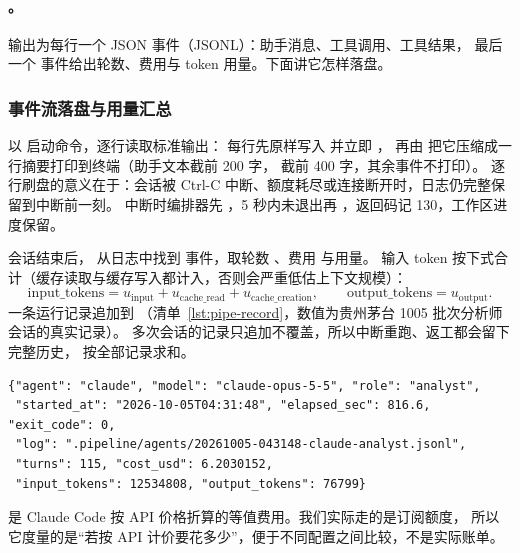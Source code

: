 \paragraph{。}输出为每行一个 JSON 事件（JSONL）：助手消息、工具调用、工具结果，
最后一个  事件给出轮数、费用与 token 用量。下面讲它怎样落盘。

\subsubsection{事件流落盘与用量汇总}

 以  启动命令，逐行读取标准输出：
每行先原样写入  并立即 ，
再由  把它压缩成一行摘要打印到终端（助手文本截前 200 字， 截前 400 字，其余事件不打印）。
逐行刷盘的意义在于：会话被 Ctrl-C 中断、额度耗尽或连接断开时，日志仍完整保留到中断前一刻。
中断时编排器先 ，5 秒内未退出再 ，返回码记 130，工作区进度保留。

会话结束后， 从日志中找到  事件，取轮数 、费用  与用量。
输入 token 按下式合计（缓存读取与缓存写入都计入，否则会严重低估上下文规模）：
\begin{equation}
  \text{input\_tokens} = u_{\text{input}} + u_{\text{cache\_read}} + u_{\text{cache\_creation}},\qquad
  \text{output\_tokens} = u_{\text{output}} .
  \label{eq:pipe-tokens}
\end{equation}
一条运行记录追加到 （清单~\ref{lst:pipe-record}，数值为贵州茅台 1005 批次分析师会话的真实记录）。
多次会话的记录只追加不覆盖，所以中断重跑、返工都会留下完整历史， 按全部记录求和。

\begin{lstlisting}[caption={\file{agent\_runs.json} 的一条记录（贵州茅台 1005 批次，分析师会话）},label={lst:pipe-record}]
{"agent": "claude", "model": "claude-opus-5-5", "role": "analyst",
 "started_at": "2026-10-05T04:31:48", "elapsed_sec": 816.6, "exit_code": 0,
 "log": ".pipeline/agents/20261005-043148-claude-analyst.jsonl",
 "turns": 115, "cost_usd": 6.2030152,
 "input_tokens": 12534808, "output_tokens": 76799}
\end{lstlisting}

 是 Claude Code 按 API 价格折算的等值费用。我们实际走的是订阅额度，
所以它度量的是“若按 API 计价要花多少”，便于不同配置之间比较，不是实际账单。

